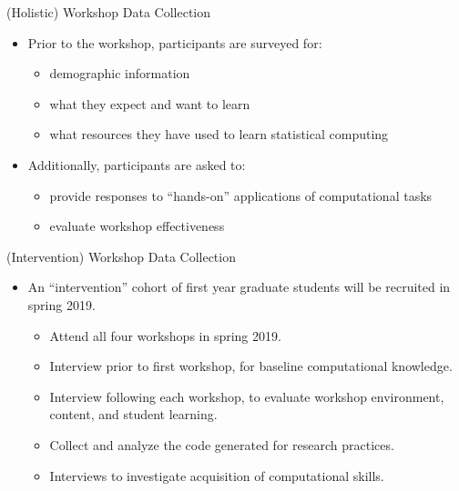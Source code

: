 \documentclass[10pt,ignorenonframetext,]{beamer}
\providecommand{\tightlist}{%
  \setlength{\itemsep}{0pt}\setlength{\parskip}{0pt}}
\begin{document}
\begin{frame}{(Holistic) Workshop Data Collection}

\begin{itemize}[<+->]
\tightlist
\item
  Prior to the workshop, participants are surveyed for:

  \begin{itemize}[<+->]
  \tightlist
  \item
    demographic information
  \item
    what they expect and want to learn
  \item
    what resources they have used to learn statistical computing
  \end{itemize}
\item
  Additionally, participants are asked to:

  \begin{itemize}[<+->]
  \tightlist
  \item
    provide responses to ``hands-on'' applications of computational
    tasks
  \item
    evaluate workshop effectiveness
  \end{itemize}
\end{itemize}

\end{frame}

\begin{frame}{(Intervention) Workshop Data Collection}

\begin{itemize}[<+->]
\tightlist
\item
  An ``intervention'' cohort of first year graduate students will be
  recruited in spring 2019.

  \begin{itemize}[<+->]
  \tightlist
  \item
    Attend all four workshops in spring 2019.
  \item
    Interview prior to first workshop, for baseline computational
    knowledge.
  \item
    Interview following each workshop, to evaluate workshop environment,
    content, and student learning.
  \item
    Collect and analyze the code generated for research practices.
  \item
    Interviews to investigate acquisition of computational skills.
  \end{itemize}
\end{itemize}

\end{frame}
\end{document}
